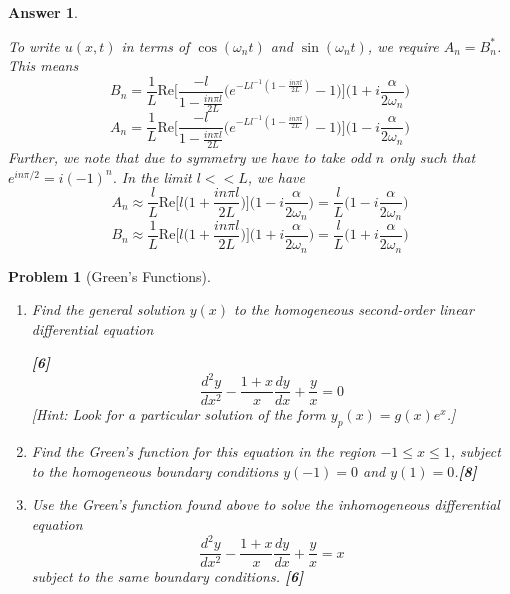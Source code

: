 \documentclass[a4paper]{article}
\newtheorem{ans}{Answer}[section]
\theoremstyle{new}
\newtheorem{qns}{Problem}[section]
\begin{document}
\begin{ans}
\begin{enumerate}[label=(\roman*)]
To write $u(x,t)$ in terms of $\cos(\omega_nt)$ and $\sin(\omega_nt)$, we require $A_n=B_n^*$. This means $$B_n=\frac{1}{L}\text{Re}\bigg[\frac{-l}{1-\frac{in\pi l}{2L}}\bigg(e^{-Ll^{-1}(1-\frac{in\pi l}{2L})}-1\bigg)\bigg]\bigg(1+i\frac{\alpha}{2\omega_n}\bigg)$$
$$A_n=\frac{1}{L}\text{Re}\bigg[\frac{-l}{1-\frac{in\pi l}{2L}}\bigg(e^{-Ll^{-1}(1-\frac{in\pi l}{2L})}-1\bigg)\bigg]\bigg(1-i\frac{\alpha}{2\omega_n}\bigg)$$
Further, we note that due to symmetry we have to take odd $n$ only such that $e^{in\pi/2}=i(-1)^n$. In the limit $l<<L$, we have
$$A_n\approx\frac{l}{L}\text{Re}\bigg[l\bigg(1+\frac{in\pi l}{2L}\bigg)\bigg]\bigg(1-i\frac{\alpha}{2\omega_n}\bigg)=\frac{l}{L}\bigg(1-i\frac{\alpha}{2\omega_n}\bigg)$$
$$B_n\approx\frac{1}{L}\text{Re}\bigg[l\bigg(1+\frac{in\pi l}{2L}\bigg)\bigg]\bigg(1+i\frac{\alpha}{2\omega_n}\bigg)=\frac{l}{L}\bigg(1+i\frac{\alpha}{2\omega_n}\bigg)$$
\end{enumerate}
\end{ans}
\newpage
\begin{qns}[Green's Functions]\leavevmode
\begin{enumerate}[label=(\roman*)]
\item Find the general solution $y(x)$ to the homogeneous second-order linear differential equation

\hfill \textbf{[6]}
$$\frac{d^2y}{dx^2}-\frac{1+x}{x}\frac{dy}{dx}+\frac{y}{x}=0$$
[Hint: Look for a particular solution of the form $y_p(x)=g(x)e^x$.]
\item Find the Green's function for this equation in the region $-1\leq x\leq 1$, subject to the homogeneous boundary conditions $y(-1)=0$ and $y(1)=0$.\hfill \textbf{[8]}
\item Use the Green's function found above to solve the inhomogeneous differential equation
$$\frac{d^2y}{dx^2}-\frac{1+x}{x}\frac{dy}{dx}+\frac{y}{x}=x$$
subject to the same boundary conditions. \hfill \textbf{[6]}
\end{enumerate}
\end{qns}
\end{document}

